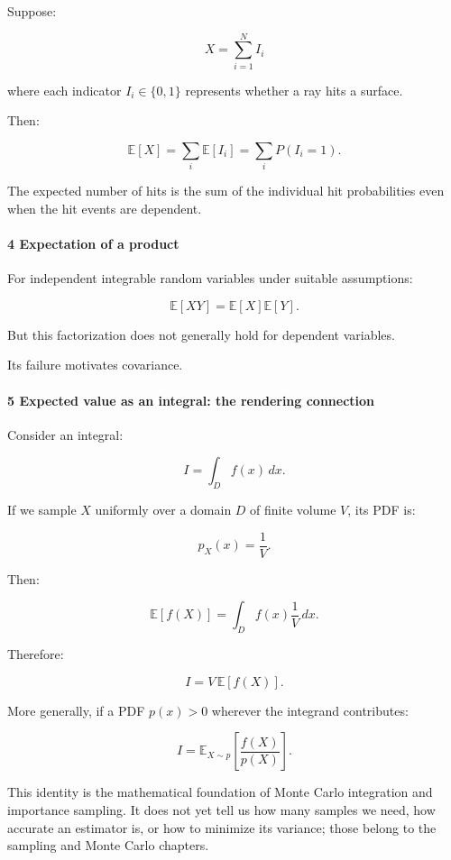 Suppose:

\[
 X=\sum_{i=1}^NI_i
\]

where each indicator \(I_i\in\{0,1\}\) represents whether a ray hits a surface.

Then:

\[
 \mathbb E[X] = \sum_i\mathbb E[I_i] = \sum_iP(I_i=1).
\]

The expected number of hits is the sum of the individual hit probabilities even when the hit events are dependent.

\paragraph{4 Expectation of a product}\label{expectation-of-a-product}

For independent integrable random variables under suitable assumptions:

\[
 \boxed{ \mathbb E[XY]=\mathbb E[X]\mathbb E[Y] }.
\]

But this factorization does not generally hold for dependent variables.

Its failure motivates covariance.

\paragraph{5 Expected value as an integral: the rendering connection}\label{expected-value-as-an-integral-the-rendering-connection}

Consider an integral:

\[
 I=\int_Df(x)\,dx.
\]

If we sample \(X\) uniformly over a domain \(D\) of finite volume \(V\), its PDF is:

\[
 p_X(x)=\frac1V.
\]

Then:

\[
 \mathbb E[f(X)] = \int_Df(x)\frac1V\,dx.
\]

Therefore:

\[
 \boxed{ I=V\,\mathbb E[f(X)] }.
\]

More generally, if a PDF \(p(x)>0\) wherever the integrand contributes:

\[
 \boxed{ I= \mathbb E_{X\sim p} \left[ \frac{f(X)}{p(X)} \right] }.
\]

This identity is the mathematical foundation of Monte Carlo integration and importance sampling. It does not yet tell us how many samples we need, how accurate an estimator is, or how to minimize its variance; those belong to the sampling and Monte Carlo chapters.

